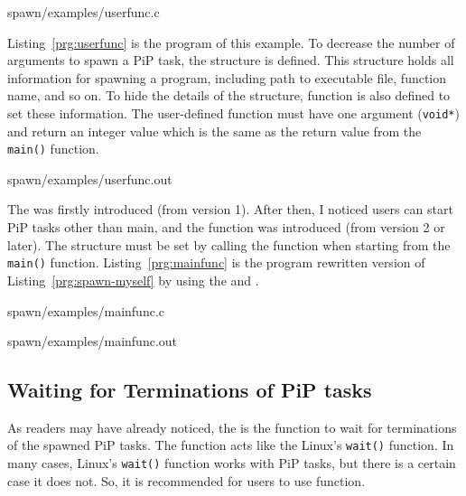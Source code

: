 
                {spawn/examples/userfunc.c}

Listing~\ref{prg:userfunc} is the program of this example. To decrease
the number of arguments to spawn a PiP task, the
 structure is defined. This structure
holds all information for spawning a program, including path to
executable file, function name, and so on. To hide the details of the
structure,  function is also defined
to set these information. The user-defined function must have one
argument ({\tt void*}) and return an integer value which is the same
as the return value from the {\tt main()} function.

 {spawn/examples/userfunc.out}

The  was firstly introduced (from version
1). After then, I noticed users can start PiP tasks other than main,
and the  function was
introduced (from version 2 or later). The
 structure must be set 
by calling the  function when
starting from the {\tt main()} function. Listing~\ref{prg:mainfunc} is
the program rewritten version of Listing~\ref{prg:spawn-myself} by
using the  and
.


                {spawn/examples/mainfunc.c}

 {spawn/examples/mainfunc.out}


\subsection{Waiting for Terminations of PiP tasks}

As readers may have already noticed, the  is the
function to wait for terminations of the spawned PiP tasks. The
 function acts like the Linux's {\tt wait()}
function. In many cases, Linux's {\tt wait()} function works with PiP
tasks, but there is a certain case it does not. So, it is recommended
for users to use  function.

